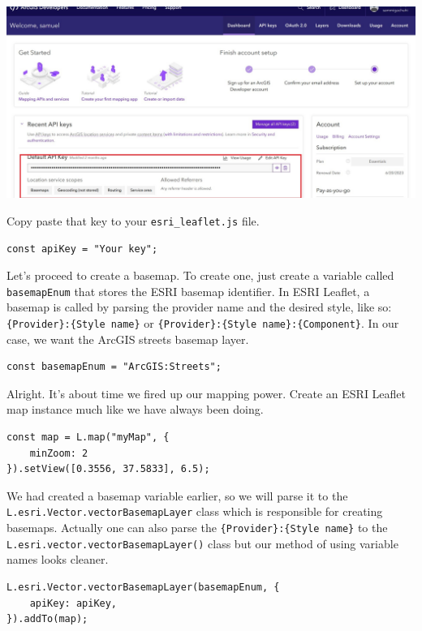 \documentclass[
]{book}
\begin{document}
\includegraphics{../images/esri_leaflet_api.jpg}

Copy paste that key to your \texttt{esri\_leaflet.js} file.

\begin{verbatim}
const apiKey = "Your key";
\end{verbatim}

Let's proceed to create a basemap. To create one, just create a variable called \texttt{basemapEnum} that stores the ESRI basemap identifier. In ESRI Leaflet, a basemap is called by parsing the provider name and the desired style, like so: \texttt{\{Provider\}:\{Style\ name\}} or
\texttt{\{Provider\}:\{Style\ name\}:\{Component\}}. In our case, we want the ArcGIS streets basemap layer.

\begin{verbatim}
const basemapEnum = "ArcGIS:Streets";
\end{verbatim}

Alright. It's about time we fired up our mapping power. Create an ESRI Leaflet map instance much like we have always been doing.

\begin{verbatim}
const map = L.map("myMap", {
    minZoom: 2
}).setView([0.3556, 37.5833], 6.5);
\end{verbatim}

We had created a basemap variable earlier, so we will parse it to the \texttt{L.esri.Vector.vectorBasemapLayer} class which is responsible for creating basemaps. Actually one can also parse the \texttt{\{Provider\}:\{Style\ name\}} to the \texttt{L.esri.vector.vectorBasemapLayer()} class but our method of using variable names looks cleaner.

\begin{verbatim}
L.esri.Vector.vectorBasemapLayer(basemapEnum, {
    apiKey: apiKey,
}).addTo(map);
\end{verbatim}
\end{document}
